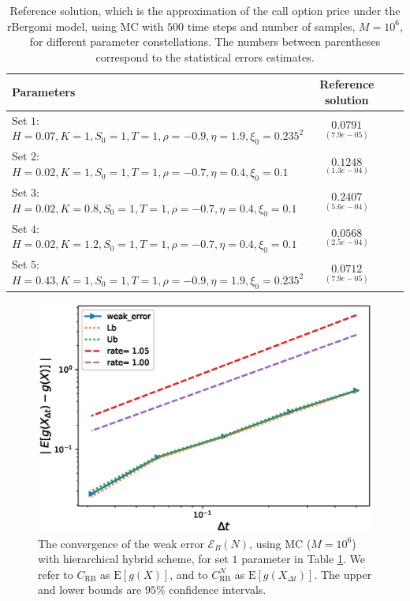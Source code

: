 \documentclass[11pt]{article}
\newcommand{\expt}[1]{\mathrm{E}\left[#1\right]}
\begin{document}
\FloatBarrier
\begin{table}[!h]
	\centering
	\begin{small}
	\begin{tabular}{l*{2}{c}r}
	\toprule[1.5pt]
		Parameters            & Reference solution    \\
		\hline

			Set $1$:	$H=0.07, K=1,S_0=1, T=1, \rho=-0.9, \eta=1.9,\xi_0=0.235^2$   & $\underset{(7.9e-05)}{0.0791}$  \\	
			
				Set $2$:	$H=0.02, K=1, S_0=1, T=1,\rho=-0.7, \eta=0.4,\xi_0=0.1$   & $\underset{(1.3e-04)}{0.1248}$  \\
					Set $3$:	$H=0.02, K=0.8,S_0=1,T=1, \rho=-0.7, \eta=0.4,\xi_0=0.1$   & $\underset{(5.6e-04)}{0.2407}$  \\
						Set $4$:	$H=0.02, K=1.2,S_0=1,T=1, \rho=-0.7, \eta=0.4,\xi_0=0.1$   & $\underset{(2.5e-04)}{0.0568}$  \\
						Set $5$:	$H=0.43, K=1,S_0=1, T=1, \rho=-0.9, \eta=1.9,\xi_0=0.235^2$   & $\underset{(7.9e-05)}{ 0.0712}$  \\	
	\bottomrule[1.25pt]
	\end{tabular}
\end{small}
	\caption{Reference solution, which is the  approximation of the call option price under the rBergomi model,  using MC with $500$ time steps and number of samples, $M=10^6$, for different parameter constellations.  The numbers between parentheses correspond to the statistical errors estimates.}
	\label{table:Reference solution, using MC with $500$ time steps, of Call option price under rBergomi model, for different parameter constellation.}
\end{table}
\FloatBarrier



\FloatBarrier
\begin{figure}[h!]
	\centering
		\includegraphics[width=0.6\linewidth]{./figures/rBergomi_weak_error_rates/without_richardson/H_007/weak_convergence_order_Bergomi_H_007_K_1_M_10_6_CI_relative}
		
	\caption{The  convergence of the weak error $\mathcal{E}_B(N)$, using MC ($M=10^6$) with hierarchical hybrid scheme, for set $1$ parameter in Table \ref{table:Reference solution, using MC with $500$ time steps, of Call option price under rBergomi model, for different parameter constellation.}. We refer to $C_{\text{RB}}$ as $\expt{g(X)}$, and to $C_{\text{RB}}^{N}$ as  $\expt{g(X_{\Delta t})}$. The upper and lower bounds are $95\%$ confidence intervals.}
	\label{fig:Weak_rate_set1_without_rich_hybrid}
\end{figure}
\FloatBarrier
\end{document}

